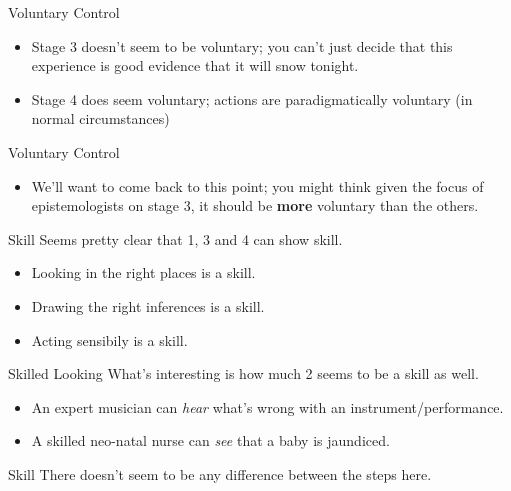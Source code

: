 \documentclass[
  17pt,
  letterpaper,
  ignorenonframetext,
  aspectratio=169,
  handout,
  xcolor={dvipsnames}]{beamer}
\providecommand{\tightlist}{%
  \setlength{\itemsep}{0pt}\setlength{\parskip}{0pt}}\usepackage{longtable,booktabs,array}
\begin{document}
\begin{frame}{Voluntary Control}
\protect\hypertarget{voluntary-control-1}{}
\begin{itemize}[<+->]
\tightlist
\item
  Stage 3 doesn't seem to be voluntary; you can't just decide that this
  experience is good evidence that it will snow tonight.
\item
  Stage 4 does seem voluntary; actions are paradigmatically voluntary
  (in normal circumstances)
\end{itemize}
\end{frame}

\begin{frame}{Voluntary Control}
\protect\hypertarget{voluntary-control-2}{}
\begin{itemize}[<+->]
\tightlist
\item
  We'll want to come back to this point; you might think given the focus
  of epistemologists on stage 3, it should be \textbf{more} voluntary
  than the others.
\end{itemize}
\end{frame}

\begin{frame}{Skill}
\protect\hypertarget{skill}{}
Seems pretty clear that 1, 3 and 4 can show skill.

\begin{itemize}[<+->]
\tightlist
\item
  Looking in the right places is a skill.
\item
  Drawing the right inferences is a skill.
\item
  Acting sensibily is a skill.
\end{itemize}
\end{frame}

\begin{frame}{Skilled Looking}
\protect\hypertarget{skilled-looking}{}
What's interesting is how much 2 seems to be a skill as well.

\begin{itemize}[<+->]
\tightlist
\item
  An expert musician can \emph{hear} what's wrong with an
  instrument/performance.
\item
  A skilled neo-natal nurse can \emph{see} that a baby is jaundiced.
\end{itemize}
\end{frame}

\begin{frame}{Skill}
\protect\hypertarget{skill-1}{}
There doesn't seem to be any difference between the steps here.
\end{frame}
\end{document}
